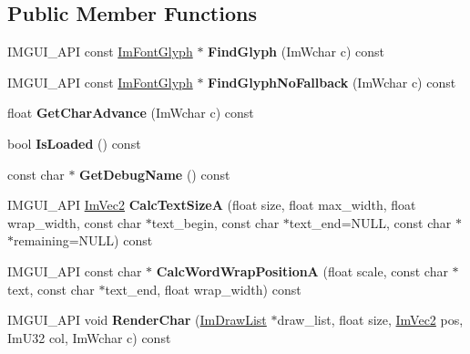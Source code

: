 \subsection*{Public Member Functions}
\begin{DoxyCompactItemize}
\item 
\mbox{\label{structImFont_ac6a773b73c6406fd8f08c4c93213a501}} 
I\+M\+G\+U\+I\+\_\+\+A\+PI const \hyperlink{structImFontGlyph}{Im\+Font\+Glyph} $\ast$ {\bfseries Find\+Glyph} (Im\+Wchar c) const
\item 
\mbox{\label{structImFont_aa9ce4765070dfdee66bf5e5e81acaac3}} 
I\+M\+G\+U\+I\+\_\+\+A\+PI const \hyperlink{structImFontGlyph}{Im\+Font\+Glyph} $\ast$ {\bfseries Find\+Glyph\+No\+Fallback} (Im\+Wchar c) const
\item 
\mbox{\label{structImFont_adffcff4e4e2d17455410bd4ba76b42e4}} 
float {\bfseries Get\+Char\+Advance} (Im\+Wchar c) const
\item 
\mbox{\label{structImFont_a97dafa61cc94e84be396d69b0d42b1ce}} 
bool {\bfseries Is\+Loaded} () const
\item 
\mbox{\label{structImFont_a11843ed46aaa122264d0da87ffafd627}} 
const char $\ast$ {\bfseries Get\+Debug\+Name} () const
\item 
\mbox{\label{structImFont_ad67f64fd206ad197f4b93b1a1ae27cfe}} 
I\+M\+G\+U\+I\+\_\+\+A\+PI \hyperlink{structImVec2}{Im\+Vec2} {\bfseries Calc\+Text\+SizeA} (float size, float max\+\_\+width, float wrap\+\_\+width, const char $\ast$text\+\_\+begin, const char $\ast$text\+\_\+end=N\+U\+LL, const char $\ast$$\ast$remaining=N\+U\+LL) const
\item 
\mbox{\label{structImFont_a3781bb82a1ceba919cb6c98a398c7a67}} 
I\+M\+G\+U\+I\+\_\+\+A\+PI const char $\ast$ {\bfseries Calc\+Word\+Wrap\+PositionA} (float scale, const char $\ast$text, const char $\ast$text\+\_\+end, float wrap\+\_\+width) const
\item 
\mbox{\label{structImFont_aa8370ddcf8d3e4e034d07de9e00fcdd1}} 
I\+M\+G\+U\+I\+\_\+\+A\+PI void {\bfseries Render\+Char} (\hyperlink{structImDrawList}{Im\+Draw\+List} $\ast$draw\+\_\+list, float size, \hyperlink{structImVec2}{Im\+Vec2} pos, Im\+U32 col, Im\+Wchar c) const
$$
\end{DoxyCompactItemize}

